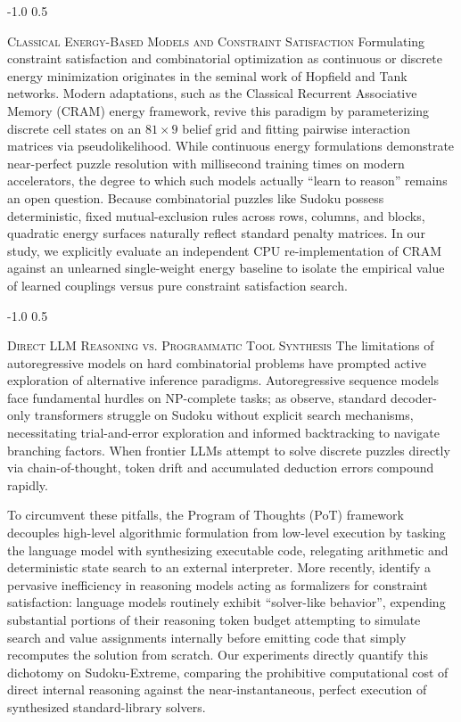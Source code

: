 \documentclass{article} %
\makeatletter
\renewcommand{\subsection}{\@startsection{subsection}{2}{\z@}%
  {-1.0\baselineskip}%
  {0.5\baselineskip}%
  {\normalfont\fontsize{10}{11}\selectfont\raggedright\scshape}}
\makeatother
\begin{document}
\subsection{\textsc{Classical Energy-Based Models and Constraint Satisfaction}}
Formulating constraint satisfaction and combinatorial optimization as continuous or discrete energy minimization originates in the seminal work of Hopfield and Tank networks. Modern adaptations, such as the Classical Recurrent Associative Memory (CRAM) energy framework, revive this paradigm by parameterizing discrete cell states on an $81 \times 9$ belief grid and fitting pairwise interaction matrices via pseudolikelihood. While continuous energy formulations demonstrate near-perfect puzzle resolution with millisecond training times on modern accelerators, the degree to which such models actually ``learn to reason'' remains an open question. Because combinatorial puzzles like Sudoku possess deterministic, fixed mutual-exclusion rules across rows, columns, and blocks, quadratic energy surfaces naturally reflect standard penalty matrices. In our study, we explicitly evaluate an independent CPU re-implementation of CRAM against an unlearned single-weight energy baseline to isolate the empirical value of learned couplings versus pure constraint satisfaction search.

\subsection{\textsc{Direct LLM Reasoning vs. Programmatic Tool Synthesis}}
The limitations of autoregressive models on hard combinatorial problems have prompted active exploration of alternative inference paradigms. Autoregressive sequence models face fundamental hurdles on NP-complete tasks; as \citet{Giannoulis2025TeachingTransformers} observe, standard decoder-only transformers struggle on Sudoku without explicit search mechanisms, necessitating trial-and-error exploration and informed backtracking to navigate branching factors. When frontier LLMs attempt to solve discrete puzzles directly via chain-of-thought, token drift and accumulated deduction errors compound rapidly.

To circumvent these pitfalls, the Program of Thoughts (PoT) framework \citep{Chen2022ProgramThoughts} decouples high-level algorithmic formulation from low-level execution by tasking the language model with synthesizing executable code, relegating arithmetic and deterministic state search to an external interpreter. More recently, \citet{Amonkar2026SolverlikeBehavior} identify a pervasive inefficiency in reasoning models acting as formalizers for constraint satisfaction: language models routinely exhibit ``solver-like behavior'', expending substantial portions of their reasoning token budget attempting to simulate search and value assignments internally before emitting code that simply recomputes the solution from scratch. Our experiments directly quantify this dichotomy on Sudoku-Extreme, comparing the prohibitive computational cost of direct internal reasoning against the near-instantaneous, perfect execution of synthesized standard-library solvers.
\end{document}
